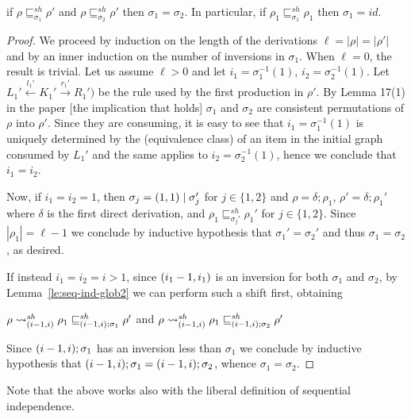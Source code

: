 \documentclass{llncs}
\newcommand{\perm}{\sigma}
\newcommand{\shiftdir}[1][]{\ensuremath{\mathrel{{\rightsquigarrow}^{\mathit{sh}}_{#1}}}}
\newcommand{\shiftpre}[1][]{\ensuremath{\mathrel{{\sqsubseteq}^{\mathit{sh}}_{#1}}}}
\begin{document}
\begin{lemma}
  if $\rho \shiftpre[\perm_1] \rho'$ and
  $\rho \shiftpre[\perm_2] \rho'$ then $\perm_1 = \perm_2$. In
  particular, if $\rho_1 \shiftpre[\perm_1] \rho_1$ then $\perm_1 = id$.
\end{lemma}

\begin{proof}
  We proceed by induction on the length of the derivations
  $\ell=|\rho|=|\rho'|$ and by an inner induction on the number of
  inversions in $\sigma_1$. When $\ell = 0$, the result is
  trivial. Let us assume $\ell>0$ and let $i_1 = \sigma_1^{-1}(1)$,
  $i_2 = \sigma_2^{-1}(1)$. Let
  $L_1' \stackrel{l_1'}{\leftarrow} K_1' \stackrel{r_1'}{\rightarrow}
  R_1')$ be the rule used by the first production in $\rho'$.
  By Lemma 17(1) in the paper [the implication
  that holds] $\sigma_1$ and $\sigma_2$ are consistent permutations of
  $\rho$ into $\rho'$.
  Since they are consuming, it is easy to see that
  $i_1=\sigma_1^{-1}(1)$ is uniquely determined by the (equivalence
  class) of an item in the initial graph consumed by $L_1'$ and the
  same applies to $i_2=\sigma_2^{-1}(1)$, hence we conclude that
  $i_1=i_2$.

  Now, if $i_1=i_2=1$, then $\sigma_j = \transp{1}[1] \mid \sigma_j'$
  for $j \in \{1,2\}$ and $\rho = \delta; \rho_1$,
  $\rho' = \delta; \rho_1'$ where $\delta$ is the first direct
  derivation, and $\rho_1 \shiftpre[\perm_j'] \rho_1'$ for
  $j \in \{1,2\}$. Since $|\rho_1| = \ell-1$ we conclude by inductive
  hypothesis that $\sigma_1'=\sigma_2'$ and thus $\sigma_1=\sigma_2$,
  as desired.

  If instead $i_1=i_2=i>1$, since $\transp{i_1-1}[i_1]$ is an inversion for both
   $\sigma_1$ and $\sigma_2$, by Lemma~\ref{le:seq-ind-glob2} we can
  perform such a shift first, obtaining
  \begin{center}
    $\rho \shiftdir[{\transp{i-1}[i]}] \rho_1
    \shiftpre[{\transp{i-1}[i];\sigma_1}] \rho'$
    \quad and \quad
    $\rho \shiftdir[{\transp{i-1}[i]}] \rho_1
    \shiftpre[{\transp{i-1}[i];\sigma_2}] \rho'$
  \end{center}
  Since ${\transp{i-1}[i];\sigma_1}$ has an inversion less than
  $\sigma_1$ we conclude by inductive hypothesis that
  ${\transp{i-1}[i];\sigma_1} ={\transp{i-1}[i];\sigma_2}$, whence
  $\sigma_1=\sigma_2$.
\end{proof}

Note that the above works also with the liberal definition of
sequential independence.
\end{document}
